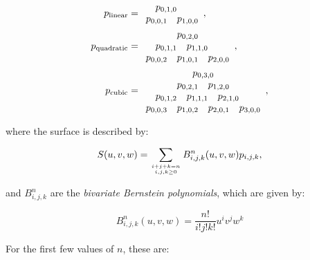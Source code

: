 \begin{align}
p_{\mathrm{linear}} &= \begin{array}{cccc}
& \multicolumn{2}{c}{p_{0,1,0}} & \\
\multicolumn{2}{c}{p_{0,0,1}} & \multicolumn{2}{c}{p_{1,0,0}}
\end{array},\\
p_{\mathrm{quadratic}} &= \begin{array}{cccccc}
\multicolumn{6}{c}{p_{0,2,0}} \\
& \multicolumn{2}{c}{p_{0,1,1}} & \multicolumn{2}{c}{p_{1,1,0}} & \\
\multicolumn{2}{c}{p_{0,0,2}} & \multicolumn{2}{c}{p_{1,0,1}} & \multicolumn{2}{c}{p_{2,0,0}}
\end{array},\\
p_{\mathrm{cubic}} &= \begin{array}{cccccccc}
\multicolumn{8}{c}{p_{0,3,0}} \\
&& \multicolumn{2}{c}{p_{0,2,1}} & \multicolumn{2}{c}{p_{1,2,0}} && \\
& \multicolumn{2}{c}{p_{0,1,2}} & \multicolumn{2}{c}{p_{1,1,1}} & \multicolumn{2}{c}{p_{2,1,0}} & \\
\multicolumn{2}{c}{p_{0,0,3}} & \multicolumn{2}{c}{p_{1,0,2}} & \multicolumn{2}{c}{p_{2,0,1}} & \multicolumn{2}{c}{p_{3,0,0}}
\end{array},
\end{align}

where the surface is described by:

\begin{equation}
S(u,v,w) = \sum_{\genfrac{}{}{0pt}{}{i+j+k=n}{i,j,k \geq 0}} B^n_{i,j,k}(u,v,w) p_{i,j,k},
\end{equation}

and \(B^n_{i,j,k}\) are the \emph{bivariate Bernstein polynomials}, which are given by:

\begin{equation}
B^n_{i,j,k}(u,v,w) = \frac{n!}{i!j!k!}u^i v^j w^k
\end{equation}

For the first few values of \(n\), these are:

